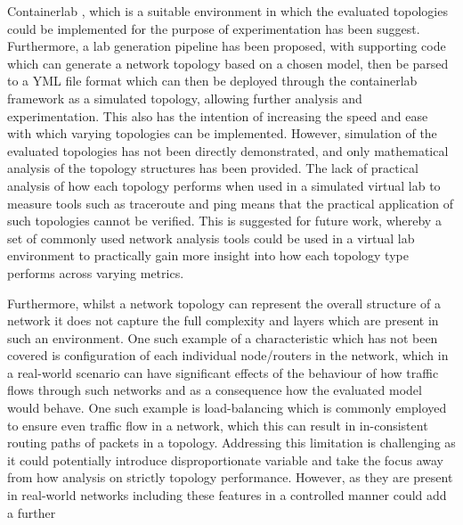 Containerlab \cite{containerlab}, which is a suitable environment in which the evaluated topologies could be implemented for the purpose of experimentation has been suggest. Furthermore, a lab generation pipeline has been proposed, with supporting code which can generate a network topology based on a chosen model, then be parsed to a YML file format which can then be deployed through the containerlab \cite{containerlab} framework as a simulated topology, allowing further analysis and experimentation. This also has the intention of increasing the speed and ease with which varying topologies can be implemented.  However, simulation of the evaluated topologies has not been directly demonstrated, and only mathematical analysis of the topology structures has been provided. The lack of practical analysis of how each topology performs when used in a simulated virtual lab to measure tools such as traceroute and ping means that the practical application of such topologies cannot be verified. This is suggested for future work, whereby a set of commonly used network analysis tools could be used in a virtual lab environment to practically gain more insight into how each topology type performs across varying metrics. 

Furthermore, whilst a network topology can represent the overall structure of a network it does not capture the full complexity and layers which are present in such an environment. One such example of a characteristic which has not been covered is configuration of each individual node/routers in the network, which in a real-world scenario can have significant effects of the behaviour of how traffic flows through such networks and as a consequence how the evaluated model would behave. One such example is load-balancing which is commonly employed to ensure even traffic flow in a network, which this can result in in-consistent routing paths of packets in a topology. Addressing this limitation is challenging as it could potentially introduce disproportionate variable and take the focus away from how analysis on strictly topology performance. However, as they are present in real-world networks including these features in a controlled manner could add a further  



